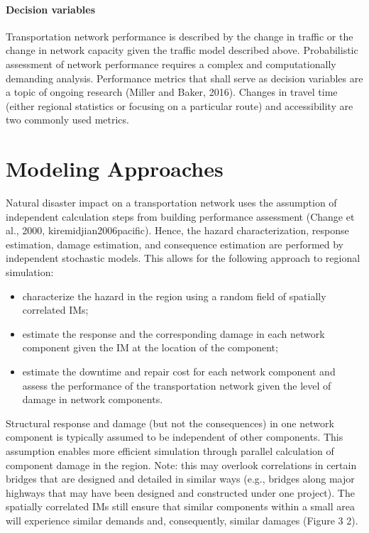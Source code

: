 \paragraph{Decision variables} Transportation network performance is described by the change in traffic or the change in network capacity given the traffic model described above. Probabilistic assessment of network performance requires a complex and computationally demanding analysis. Performance metrics that shall serve as decision variables are a topic of ongoing research (Miller and Baker, 2016). Changes in travel time (either regional statistics or focusing on a particular route) and accessibility are two commonly used metrics.

\section{Modeling Approaches}
\label{sec:perf_transport_methods}

Natural disaster impact on a transportation network uses the assumption of independent calculation steps from building performance assessment (Change et al., 2000, kiremidjian2006pacific). Hence, the hazard characterization, response estimation, damage estimation, and consequence estimation are performed by independent stochastic models. This allows for the following approach to regional simulation:

\begin{itemize}
    \item characterize the hazard in the region using a random field of spatially correlated IMs;
    \item estimate the response and the corresponding damage in each network component given the IM at the location of the component;
    \item estimate the downtime and repair cost for each network component and assess the performance of the transportation network given the level of damage in network components.
\end{itemize}

Structural response and damage (but not the consequences) in one network component is typically assumed to be independent of other components. This assumption enables more efficient simulation through parallel calculation of component damage in the region. Note: this may overlook correlations in certain bridges that are designed and detailed in similar ways (e.g., bridges along major highways that may have been designed and constructed under one project). The spatially correlated IMs still ensure that similar components within a small area will experience similar demands and, consequently, similar damages (Figure 3 2).

